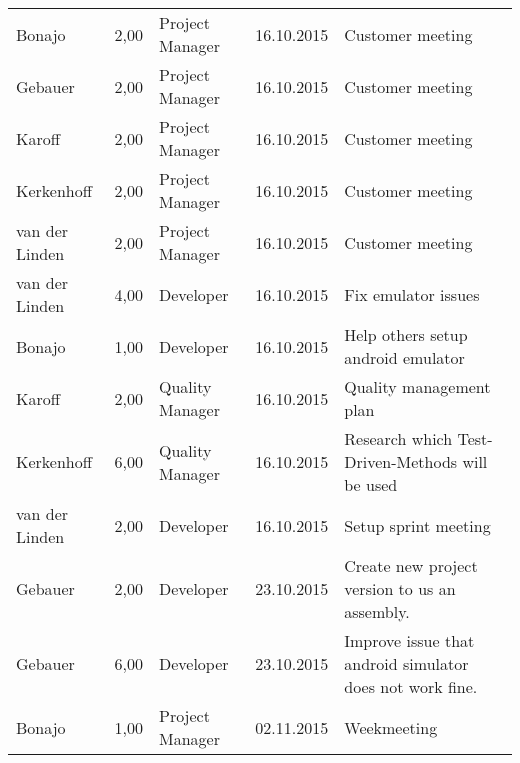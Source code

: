 \begin{longtable}{ l r p{2cm} c p{4cm} }
		Bonajo                  & 2,00           & Project Manager       & 16.10.2015    & Customer meeting                                                                 \\
		Gebauer                 & 2,00           & Project Manager       & 16.10.2015    & Customer meeting                                                                 \\
		Karoff                  & 2,00           & Project Manager       & 16.10.2015    & Customer meeting                                                                 \\
		Kerkenhoff              & 2,00           & Project Manager       & 16.10.2015    & Customer meeting                                                                 \\
		van der Linden          & 2,00           & Project Manager       & 16.10.2015    & Customer meeting                                                                 \\
		van der Linden          & 4,00           & Developer             & 16.10.2015    & Fix emulator issues                                                             \\
		Bonajo                  & 1,00           & Developer             & 16.10.2015    & Help others setup android emulator                                              \\
		Karoff                  & 2,00           & Quality Manager       & 16.10.2015    & Quality management plan                                                         \\
		Kerkenhoff              & 6,00           & Quality Manager       & 16.10.2015    & Research which Test-Driven-Methods will be used                                 \\
		van der Linden          & 2,00           & Developer             & 16.10.2015    & Setup sprint meeting                                                            \\
		Gebauer                 & 2,00           & Developer             & 23.10.2015    & Create new project version to us an assembly.                                   \\
		Gebauer                 & 6,00           & Developer             & 23.10.2015    & Improve issue that android simulator does not work fine.                        \\
		Bonajo                  & 1,00           & Project Manager       & 02.11.2015    & Weekmeeting                                                                     \\

\end{longtable}
